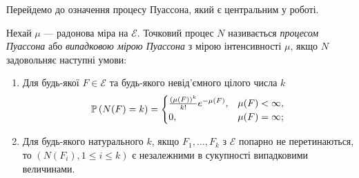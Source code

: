 Перейдемо до означення процесу Пуассона, який є центральним у роботі.
\begin{definition}
    Нехай $\mu$ --- радонова міра на $\mathcal{E}$.
    Точковий процес $N$ називається \emph{процесом Пуассона} або
    \emph{випадковою мірою Пуассона} з мірою інтенсивності $\mu$, якщо $N$ 
    задовольняє наступні умови:
    \begin{enumerate}
        \item Для будь-якої $F \in \mathcal{E}$ 
        та будь-якого невід'ємного цілого числа $k$
        \begin{gather*}
            \P{N(F) = k} = \begin{cases}
                \frac{(\mu(F))^k}{k!} e^{-\mu(F)}, & \mu(F) < \infty, \\
                0, & \mu(F) = \infty;
            \end{cases}
        \end{gather*}
        \item Для будь-якого натурального $k$, 
        якщо $F_1, \dots, F_k$ з $\mathcal{E}$ попарно не перетинаються, то
        $\left(N(F_i), 1\leq i \leq k\right)$ є незалежними в сукупності випадковими величинами.
    \end{enumerate}
\end{definition}

